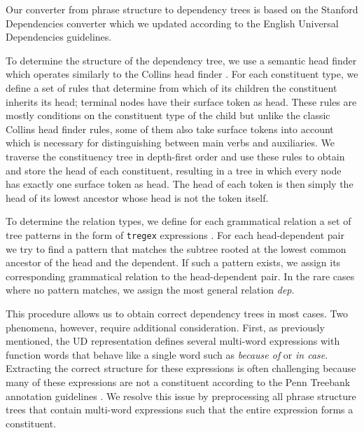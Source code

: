 \documentclass[10pt, a4paper]{article}
\begin{document}
Our converter from phrase structure to dependency trees is based 
on the Stanford Dependencies converter \cite{demarneffe2006generating} which we
updated according to the English Universal Dependencies guidelines.

To determine the structure of the dependency tree, we use a semantic head finder which operates 
similarly to the Collins head finder \cite{collins1999head}. For each constituent type,
we define a set of rules that determine from which of its children the constituent inherits its head;
terminal nodes have their surface token as head. These rules are mostly conditions 
on the constituent type of the child but unlike the classic Collins head finder rules, some of them 
also take surface tokens into account which is necessary for distinguishing between main verbs and auxiliaries. 
We traverse the constituency tree in depth-first order and use these rules to obtain and store the head of each constituent, resulting in 
a tree in which every node has exactly one surface token as head. The head of each token is then simply the head of its
lowest ancestor whose head is not the token itself.

To determine the relation types, we define for each grammatical relation a set of
tree patterns in the form of \texttt{tregex} expressions \cite{levy2006tregex}. For each head-dependent pair
we try to find a pattern that matches the subtree rooted at the lowest common ancestor of the 
head and the dependent. If such a pattern exists, we assign its corresponding grammatical relation to
the head-dependent pair. In the rare cases where no pattern matches, we assign the most general relation 
\textit{dep}.



This procedure allows us to obtain correct dependency trees in most cases.
Two phenomena, however, require additional consideration.  First, as previously mentioned, the UD representation 
defines several multi-word expressions
with function words that behave like a single word such as \textit{because of} or \textit{in case}. Extracting the correct structure
for these expressions is often challenging because many of these expressions are not a constituent according to the 
Penn Treebank annotation guidelines \cite{marcus1993building}. We resolve this issue by preprocessing all phrase structure 
trees that contain multi-word expressions such that the entire expression forms a constituent. 
\end{document}
